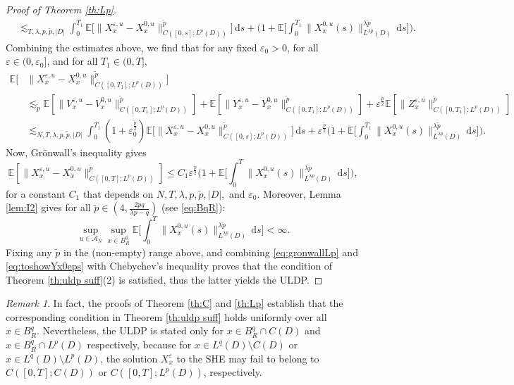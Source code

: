 \documentclass{amsart}
\theoremstyle{plain}
\theoremstyle{remark}
\newtheorem{remark}[theorem]{Remark}
\theoremstyle{plain}
\numberwithin{equation}{section}
\newcommand{\E}{{\mathbb E}}
\newcommand{\eps}{\varepsilon}
\newcommand{\A}{{\mathcal A}}
\newcommand{\dd}{\,\mathrm{d}}
\begin{document}
\begin{proof}[Proof of Theorem \ref{th:Lp}]
\begin{align*}
  &\lesssim_{T,\lambda,p,\tilde p,|D|} \int_0^{T_1}  \E\big[ \|X_x^{\eps,u}-X_x^{0,u} \|_{C([0,s];L^{p}(D))}^{{\tilde p}}\big]\dd s  + \Big(1+\E\Big[\int_0^{T_1}\|X_x^{0,u}(s)\|_{L^{\lambda p}(D)}^{{\lambda\tilde p}}\dd s\Big]\Big). 
  \end{align*} 
Combining the estimates above, we find that for any fixed $\eps_0>0$, for all $\eps\in(0,\eps_0]$, and for all $T_1\in(0,T]$, 
\begin{align*}
  \E[&\| X_x^{\eps,u} - X_x^{0,u} \|_{C([0,T_1];L^{p}(D))}^{{\tilde p}}] \\
  &\lesssim_{{\tilde p}} \E[\| V_x^{\eps,u} - V_x^{0,u} \|_{C([0,T_1];L^{p}(D))}^{{\tilde p}}]+\E[\| Y_x^{\eps,u} - Y_x^{0,u} \|_{C([0,T_1];L^{p}(D))}^{{\tilde p}}]+\eps^{\frac{{\tilde p}}{2}}\E[\|Z_x^{\eps,u}\|_{C([0,T_1];L^{p}(D))}^{{\tilde p}}]\\
  &\lesssim_{N,T,\lambda, p,\tilde p,|D|} \int_0^{T_1} (1+\eps_0^{\frac{\tilde p}{2}})\E\big[ \|X_x^{\eps,u}-X_x^{0,u} \|_{C([0,s];L^{p}(D))}^{{\tilde p}}\big]\dd s  +\eps^{\frac{{\tilde p}}{2}}\Big(1+\E\Big[\int_0^{T_1}\|X_x^{0,u}(s)\|_{L^{\lambda p}(D)}^{{\lambda\tilde p}}\dd s\Big]\Big). 
  \end{align*}
Now, Gr\"onwall's inequality gives 
\begin{equation}\label{eq:gronwallLp}
\E[\| X_x^{\eps,u} - X_x^{0,u} \|_{C([0,T];L^{p}(D))}^{{\tilde p}}]\leq C_1\eps^{\frac{{\tilde p}}{2}}\Big(1+\E\Big[\int_0^T\|X_x^{0,u}(s)\|_{L^{\lambda p}(D)}^{\lambda\tilde p}\dd s\Big]\Big),
\end{equation}
for a constant $C_1$ that depends on $N,T,\lambda, p,\tilde p,|D|,$ and $\eps_0$. 
Moreover, Lemma \ref{lem:I2} gives for all $\tilde{p}\in(4,\frac{2pq}{\lambda p-q})$ (see \eqref{eq:BqR}):  
\begin{equation}\label{eq:toshowYx0eps}
  \sup_{u\in\A_N}\sup_{x\in B_R^q} \E\Big[\int_0^T\|X_x^{0,u}(s)\|_{L^{\lambda p}(D)}^{\lambda\tilde p}\dd s\Big]<\infty.
\end{equation}  
Fixing any $\tilde p$ in the (non-empty) range above, and combining \eqref{eq:gronwallLp} and \eqref{eq:toshowYx0eps} with  Chebychev's inequality proves that the condition of Theorem \ref{th:uldp suff}(2) is satisfied, thus the latter yields the ULDP.  
\end{proof}

\begin{remark}\label{rem:Lq initial data}
In fact, the proofs of Theorem \ref{th:C} and \ref{th:Lp} establish  that the corresponding  condition in Theorem \ref{th:uldp suff} holds uniformly over all $x\in B_R^q$. Nevertheless, the ULDP is stated only for $x\in B_R^q\cap C(D)$ and  $x\in B_R^q\cap L^p(D)$ respectively, because for $x\in L^q(D)\setminus C(D)$ or $x\in L^q(D)\setminus L^p(D)$, the solution $X_x^\eps$ to the SHE may fail to belong to $C([0,T];C(D))$ or $C([0,T];L^p(D))$, respectively. 
\end{remark}
\end{document}

